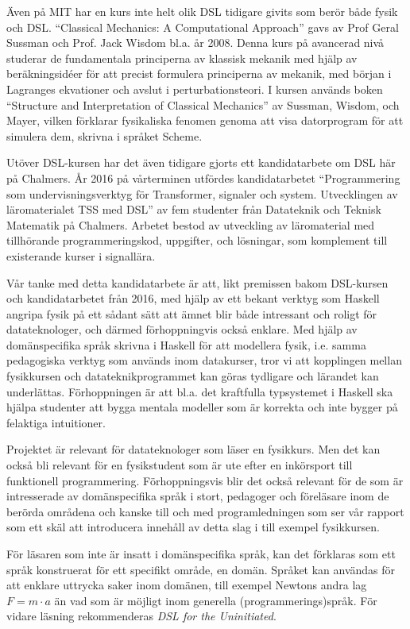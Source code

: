 \documentclass[12pt,a4paper]{article}
\begin{document}
Även på MIT har en kurs inte helt olik DSL tidigare givits som berör både fysik
och DSL. ``Classical Mechanics: A Computational Approach'' gavs av
Prof Geral Sussman och Prof. Jack Wisdom bl.a. år
2008.\cite{classical-mechanics-course-mit-2008}
Denna kurs på avancerad nivå studerar de fundamentala principerna av klassisk mekanik
med hjälp av beräkningsidéer för att precist formulera principerna av
mekanik, med början i Lagranges ekvationer och avslut i
perturbationsteori. I kursen används boken ``Structure and
Interpretation of Classical Mechanics'' av Sussman, Wisdom, och Mayer,
vilken förklarar fysikaliska fenomen genoma att visa datorprogram för att
simulera dem, skrivna i språket Scheme.\cite{SICM}

Utöver DSL-kursen har det även tidigare gjorts ett kandidatarbete om DSL
här på Chalmers. År 2016 på vårterminen utfördes kandidatarbetet
``Programmering som undervisningsverktyg för Transformer, signaler och
system. Utvecklingen av läromaterialet TSS med DSL'' av fem studenter
från Datateknik och Teknisk Matematik på Chalmers. Arbetet bestod av
utveckling av läromaterial med tillhörande programmeringskod,
uppgifter, och lösningar, som komplement till existerande kurser i
signallära.\cite{kandidat2016}

Vår tanke med detta kandidatarbete är att, likt premissen bakom DSL-kursen
och kandidatarbetet från 2016, med hjälp av ett bekant verktyg
som Haskell angripa fysik på ett sådant sätt att ämnet blir både
intressant och roligt för datateknologer, och därmed förhoppningvis
också enklare. Med hjälp av domänspecifika språk skrivna i Haskell för att
modellera fysik, i.e. samma pedagogiska verktyg som används inom
datakurser, tror vi att kopplingen mellan fysikkursen och
datateknikprogrammet kan göras tydligare och lärandet kan underlättas.
Förhoppningen är att bl.a. det kraftfulla typsystemet i Haskell ska
hjälpa studenter att bygga mentala modeller som är korrekta och inte
bygger på felaktiga intuitioner.

Projektet är relevant för datateknologer som läser en fysikkurs. Men
det kan också bli relevant för en fysikstudent som är ute efter en
inkörsport till funktionell programmering. Förhoppningsvis blir det
också relevant för de som är intresserade av domänspecifika språk i
stort, pedagoger och föreläsare inom de berörda områdena och kanske
till och med programledningen som ser vår rapport som ett skäl att
introducera innehåll av detta slag i till exempel fysikkursen.

För läsaren som inte är insatt i domänspecifika språk, kan det
förklaras som ett språk konstruerat för ett specifikt område, en
domän. Språket kan användas för att enklare uttrycka saker inom
domänen, till exempel Newtons andra lag $F=m \cdot a$ än vad som är
möjligt inom generella (programmerings)språk. För vidare läsning
rekommenderas \textit{DSL for the Uninitiated}.\cite{DSLU}
\end{document}
